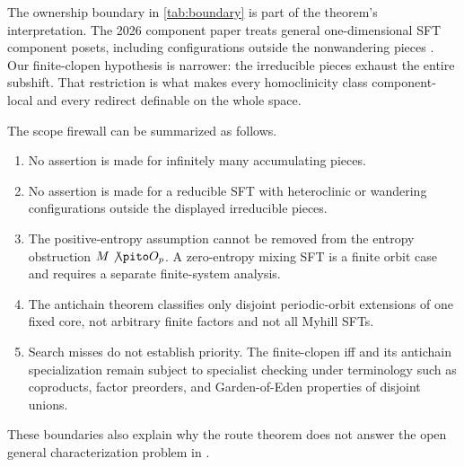 

The ownership boundary in \cref{tab:boundary} is part of the theorem's
interpretation.  The 2026 component paper treats general one-dimensional SFT
component posets, including configurations outside the nonwandering pieces
\cite{ceccheriniCoornaertSalo2026}.  Our finite-clopen hypothesis is narrower:
the irreducible pieces exhaust the entire subshift.  That restriction is what
makes every homoclinicity class component-local and every redirect definable
on the whole space.

The scope firewall can be summarized as follows.

\begin{enumerate}[label=(\alph*)]
  \item No assertion is made for infinitely many accumulating pieces.
  \item No assertion is made for a reducible SFT with heteroclinic or wandering
  configurations outside the displayed irreducible pieces.
  \item The positive-entropy assumption cannot be removed from the entropy
  obstruction $M\not\pito O_p$.  A zero-entropy mixing SFT is a finite orbit
  case and requires a separate finite-system analysis.
  \item The antichain theorem classifies only disjoint periodic-orbit
  extensions of one fixed core, not arbitrary finite factors and not all
  Myhill SFTs.
  \item Search misses do not establish priority.  The finite-clopen iff and
  its antichain specialization remain subject to specialist checking under
  terminology such as coproducts, factor preorders, and Garden-of-Eden
  properties of disjoint unions.
\end{enumerate}

These boundaries also explain why the route theorem does not answer the open
general characterization problem in
\cite[Section~9]{ceccheriniCoornaertSalo2026}.
